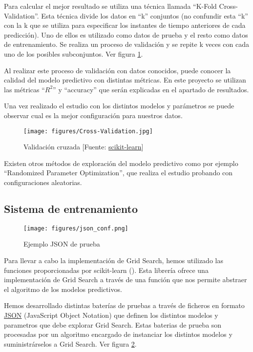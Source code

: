 	Para calcular el mejor resultado se utiliza una técnica llamada ``K-Fold Cross-Validation''. Esta técnica divide los datos en ``k'' conjuntos (no confundir esta ``k'' con la k que se utiliza para especificar los instantes de tiempo anteriores de cada predicción). Uno de ellos es utilizado como datos de prueba y el resto como datos de entrenamiento. Se realiza un proceso de validación y se repite k veces con cada uno de los posibles subconjuntos. Ver figura \ref{cross}.

	Al realizar este proceso de validación con datos conocidos, puede conocer la calidad del modelo predictivo con distintas métricas. En este proyecto se utilizan las métricas ``\(R^2\)'' y ``accuracy'' que serán explicadas en el apartado de resultados.

	Una vez realizado el estudio con los distintos modelos y parámetros se puede observar cual es la mejor configuración para nuestros datos.

	\begin{figure}[htb]
		\begin{center}
			\texttt{[image: figures/Cross-Validation.jpg]}
			\caption{Validación cruzada [Fuente: \href{www.scikit-learn.org}{scikit-learn}] \label{cross}}
		\end{center}	
	\end{figure}
	
	Existen otros métodos de exploración del modelo predictivo como por ejemplo ``Randomized Parameter Optimization'', que realiza el estudio probando con configuraciones aleatorias.

	\subsection{Sistema de entrenamiento}
	
	\begin{figure}[htb]
		\begin{center}
			\texttt{[image: figures/json\_conf.png]}
			\caption{Ejemplo JSON de prueba \label{json}}
		\end{center}
	\end{figure}

	Para llevar a cabo la implementación de Grid Search, hemos utilizado las funciones proporcionadas por scikit-learn (\cite{ARP:Scikit:2017}).
	Esta librería ofrece una implementación de Grid Search a través de una función que nos permite abstraer el algoritmo de los modelos predictivos.

	Hemos desarrollado distintas baterías de pruebas a través de ficheros en formato \href{www.json.org/json-es.html}{JSON} (JavaScript Object Notation) que definen los distintos modelos y parametros que debe explorar Grid Search.
	Estas baterias de prueba son procesadas por un algoritmo encargado de instanciar los distintos modelos y suministrárselos a Grid Search. Ver figura \ref{json}.

